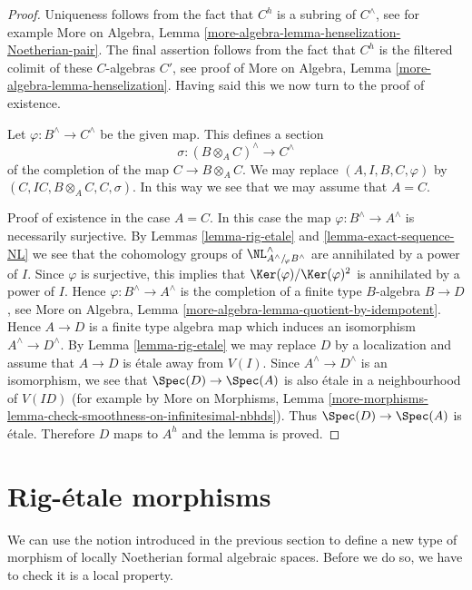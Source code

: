 \begin{proof}
Uniqueness follows from the fact that $C^h$ is a subring of
$C^\wedge$, see for example
More on Algebra, Lemma \ref{more-algebra-lemma-henselization-Noetherian-pair}.
The final assertion follows from the fact that $C^h$ is the filtered colimit
of these $C$-algebras $C'$, see proof of
More on Algebra, Lemma \ref{more-algebra-lemma-henselization}.
Having said this we now turn to the proof of existence.

\medskip\noindent
Let $\varphi : B^\wedge \to C^\wedge$ be the given map.
This defines a section
$$
\sigma : (B \otimes_A C)^\wedge \longrightarrow C^\wedge
$$
of the completion of the map $C \to B \otimes_A C$. We may
replace $(A, I, B, C, \varphi)$ by $(C, IC, B \otimes_A C, C, \sigma)$.
In this way we see that we may assume that $A = C$.

\medskip\noindent
Proof of existence in the case $A = C$. In this case the map
$\varphi : B^\wedge \to A^\wedge$ is necessarily surjective.
By Lemmas \ref{lemma-rig-etale} and \ref{lemma-exact-sequence-NL}
we see that the cohomology groups of
$\NL_{A^\wedge/\!_\varphi B^\wedge}^\wedge$
are annihilated by a power of $I$. Since $\varphi$ is surjective,
this implies that $\Ker(\varphi)/\Ker(\varphi)^2$ is annihilated
by a power of $I$. Hence $\varphi : B^\wedge \to A^\wedge$
is the completion of a finite type $B$-algebra $B \to D$, see
More on Algebra, Lemma \ref{more-algebra-lemma-quotient-by-idempotent}.
Hence $A \to D$ is a finite type algebra map which induces an isomorphism
$A^\wedge \to D^\wedge$. By
Lemma \ref{lemma-rig-etale} we may replace $D$ by a localization
and assume that $A \to D$ is \'etale away from $V(I)$.
Since $A^\wedge \to D^\wedge$ is an isomorphism, we see that
$\Spec(D) \to \Spec(A)$ is also \'etale in a neighbourhood of $V(ID)$
(for example by
More on Morphisms, Lemma
\ref{more-morphisms-lemma-check-smoothness-on-infinitesimal-nbhds}).
Thus $\Spec(D) \to \Spec(A)$ is \'etale. Therefore $D$ maps to
$A^h$ and the lemma is proved.
\end{proof}






\section{Rig-\'etale morphisms}
\label{section-rig-etale-morphisms}

\noindent
We can use the notion introduced in the previous section to define
a new type of morphism of locally Noetherian formal algebraic spaces.
Before we do so, we have to check it is a local property.

